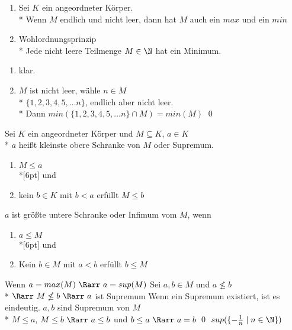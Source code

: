 	\begin{enumerate}
	\item{Sei $K$ ein angeordneter Körper.\\*
	Wenn $M$ endlich und nicht leer, dann hat $M$ auch ein $max$ und ein $min$}
	\item{Wohlordnungsprinzip\\*
	Jede nicht leere Teilmenge $M \in \N$ hat ein Minimum.}
	\end{enumerate}
\bew
	\begin{enumerate}
	\item{klar.}
	\item{$M$ ist nicht leer, wähle $n \in M$\\*
	$\{1, 2, 3, 4, 5, … n\}$, endlich aber nicht leer.\\*
	Dann $min(\{1, 2, 3, 4, 5, … n\} \cap M) = min(M)$ \qed}
	\end{enumerate}

	Sei $K$ ein angeordneter Körper und $M \subseteq K$, $a \in K$\\*
	$a$ heißt kleinste obere Schranke von $M$ oder Supremum.
	\begin{enumerate}
	\item{$M \leq a$}\\*[6pt]
	und
	\item{kein $b \in K$ mit $b < a$ erfüllt $M \leq b$}
	\end{enumerate}
	$a$ ist größte untere Schranke oder Infimum vom $M$, wenn
	\begin{enumerate}
	\item{$a \leq M$}\\*[6pt]
	und
	\item{Kein $b \in M$ mit $a < b$ erfüllt $b \leq M$}
	\end{enumerate}
\bem
	Wenn $a = max(M)\ \Rarr\ a = sup(M)$ 
\bew
	Sei $a, b \in M$ und $a \nleq b$\\*
	$\Rarr\ M \nleq b\ \Rarr\ a$ ist Supremum
\bem
	Wenn ein Supremum existiert, ist es eindeutig.
\bew
	$a, b$ sind Supremum von $M$\\*
	$M \leq a$, $M \leq b\ \Rarr\ a \leq b $ und $b \leq a\ \Rarr\ a = b$ \qed
\bsp
	$sup(\{ -\frac{1}{n} \mid n \in \N \})$